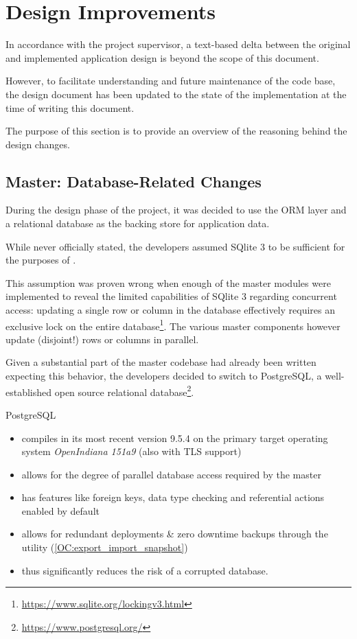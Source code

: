 \section{Design Improvements}\label{di}

In accordance with the project supervisor, a text-based delta between the original and implemented application design
is beyond the scope of this document.

However, to facilitate understanding and future maintenance of the code base, the design document has been updated to the state of
the implementation at the time of writing this document.

The purpose of this section is to provide an overview of the reasoning behind the design changes.


\subsection{Master: Database-Related Changes}\label{di:dbchanges}

During the design phase of the project, it was decided to use the  ORM layer and a relational database as the backing store
for \mamid application data.

While never officially stated, the developers assumed SQlite 3 to be sufficient for the purposes of \mamid.

This assumption was proven wrong when enough of the master modules were implemented to reveal the limited capabilities of SQlite 3 regarding
concurrent access: updating a single row or column in the database effectively requires an exclusive lock on the entire 
database\footnote{\url{https://www.sqlite.org/lockingv3.html}}.
The various master components however update (disjoint!) rows or columns in parallel.

Given a substantial part of the master codebase had already been written expecting this behavior, the developers decided to switch to
PostgreSQL, a well-established open source relational database\footnote{\url{https://www.postgresql.org/}}.

PostgreSQL
\begin{itemize}
\item compiles in its most recent version 9.5.4 on the primary target operating system \textit{OpenIndiana 151a9} (also with TLS support)
\item allows for the degree of parallel database access required by the master
\item has features like foreign keys, data type checking and referential actions enabled by default %
\item allows for redundant deployments \& zero downtime backups through the  utility 
(\ref{OC:export_import_snapshot})
\item thus significantly reduces the risk of a corrupted database.
\end{itemize}

